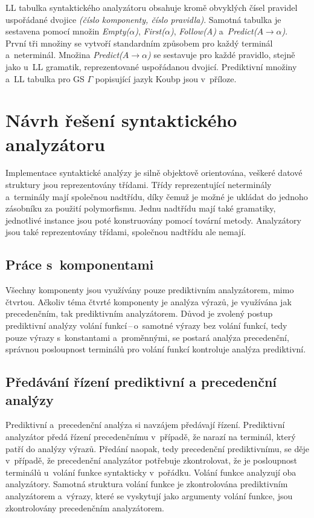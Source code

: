 LL tabulka syntaktického analyzátoru obsahuje kromě obvyklých čísel pravidel uspořádané dvojice \emph{(číslo komponenty, číslo pravidla)}.
Samotná tabulka je sestavena pomocí množin \emph{Empty($\alpha$)}, \emph{First($\alpha$)}, \emph{Follow(A)} a~\emph{Predict($A \rightarrow \alpha$)}.
První tři množiny se vytvoří standardním způsobem pro každý terminál a~neterminál.
Množina \emph{Predict($A \rightarrow \alpha$)} se sestavuje pro každé pravidlo, stejně jako u~LL gramatik, reprezentované uspořádanou dvojicí.
Prediktivní množiny a~LL tabulka pro GS $\Gamma$ popisující jazyk Koubp jsou v~příloze. 

\section{Návrh řešení syntaktického analyzátoru}\label{kap_reseni_sa}
Implementace syntaktické analýzy je silně objektově orientována, veškeré datové struktury jsou reprezentovány třídami.
Třídy reprezentující neterminály a~terminály mají společnou nadtřídu, díky čemuž je možné je ukládat do jednoho zásobníku za použití polymorfismu.
Jednu nadtřídu mají také gramatiky, jednotlivé instance jsou poté konstruovány pomocí tovární metody.
Analyzátory jsou také reprezentovány třídami, společnou nadtřídu ale nemají.

\subsection*{Práce s~komponentami}
Všechny komponenty jsou využívány pouze prediktivním analyzátorem, mimo čtvrtou.
Ačkoliv téma čtvrté komponenty je analýza výrazů, je využívána jak precedenčním, tak prediktivním analyzátorem.
Důvod je zvolený postup prediktivní analýzy volání funkcí\,--\,o~samotné výrazy bez volání funkcí, tedy pouze výrazy s~konstantami a~proměnnými, se postará analýza precedenční, správnou posloupnost terminálů pro volání funkcí kontroluje analýza prediktivní.


\subsection*{Předávání řízení prediktivní a precedenční analýzy}
Prediktivní a~precedenční analýza si navzájem předávají řízení.
Prediktivní analyzátor předá řízení precedenčnímu v~případě, že narazí na terminál, který patří do analýzy výrazů.
Předání naopak, tedy precedenční prediktivnímu, se děje v~případě, že precedenční analyzátor potřebuje zkontrolovat, že je posloupnost terminálů u~volání funkce syntakticky v~pořádku.
Volání funkce analyzují oba analyzátory.
Samotná struktura volání funkce je zkontrolována prediktivním analyzátorem a~výrazy, které se vyskytují jako argumenty volání funkce, jsou zkontrolovány precedenčním analyzátorem.

